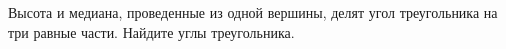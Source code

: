 \begin{ex}
	\begin{condition}
		Высота и медиана, проведенные из одной вершины, делят угол треугольника на три равные части. Найдите углы треугольника.
	\end{condition}
	\answer{\( 30\degree, 60\degree, 90\degree\)}
\end{ex}